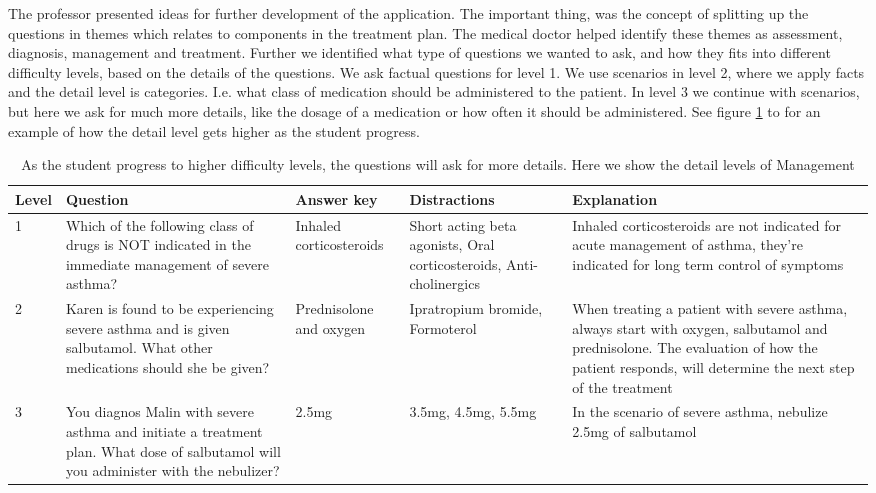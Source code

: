 The professor presented ideas for further development of the application. The important thing, was the concept of splitting up the questions in themes which relates to components in the treatment plan. The medical doctor helped identify these themes as assessment, diagnosis, management and treatment. Further we identified what type of questions we wanted to ask, and how they fits into different difficulty levels, based on the details of the questions. We ask factual questions for level 1. We use scenarios in level 2, where we apply facts and the detail level is categories. I.e. what class of medication should be administered to the patient. In level 3 we continue with scenarios, but here we ask for much more details, like the dosage of a medication or how often it should be administered. See figure \ref{table:QuestionsDetailLevels} to for an example of how the detail level gets higher as the student progress.

\begin{table}[h!]
	\label{table:QuestionsDetailLevels}
	\begin{tabular}{ | m{2em} | m{7em}| m{5.5em} | m{5em}| m{7.5em} |} 
		\hline
		Level & Question & Answer key & Distractions & Explanation \\
		\hline
		1 & Which of the following class of drugs is NOT indicated in the immediate management of severe asthma? & Inhaled corticosteroids & Short acting beta agonists, Oral corticosteroids, Anti-cholinergics & Inhaled corticosteroids are not indicated for acute management of asthma, they're indicated for long term control of symptoms \\
		\hline
		2 & Karen is found to be experiencing severe asthma and is given salbutamol. What other medications should she be given? & Prednisolone and oxygen & Ipratropium bromide, Formoterol & When  treating a patient with severe asthma, always start with oxygen, salbutamol and prednisolone. The evaluation of how the patient responds, will determine the next step of the treatment \\ 
		\hline
		3 & You diagnos Malin with severe asthma and initiate a treatment plan. What dose of salbutamol will you administer with the nebulizer? & 2.5mg & 3.5mg, 4.5mg, 5.5mg & In the scenario of severe asthma, nebulize 2.5mg of salbutamol \\
		\hline
	\end{tabular}
\caption{As the student progress to higher difficulty levels, the questions will ask for more details. Here we show the detail levels of Management}
\end{table}

